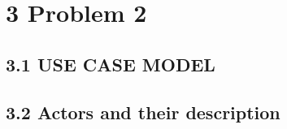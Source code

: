 \section{3 Problem 2}
\vspace{10pt}

\subsection{3.1 USE CASE MODEL}
\vspace{10pt}

\vspace{100pt}
\subsection{3.2 Actors and their description}
\vspace{10pt}





